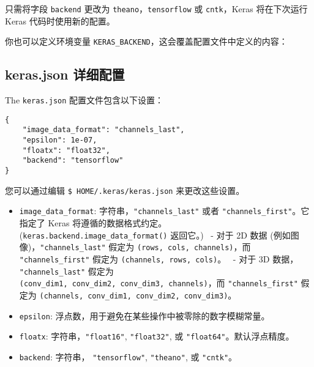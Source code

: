 只需将字段 \texttt{backend} 更改为 \texttt{theano}，\texttt{tensorflow}
或 \texttt{cntk}，Keras 将在下次运行 Keras 代码时使用新的配置。

你也可以定义环境变量
\texttt{KERAS\_BACKEND}，这会覆盖配置文件中定义的内容：

\begin{Shaded}
\begin{Highlighting}[]
 
 
\end{Highlighting}
\end{Shaded}


\subsection{keras.json
详细配置}\label{keras.json-ux8be6ux7ec6ux914dux7f6e}

The \texttt{keras.json} 配置文件包含以下设置：

\begin{verbatim}
{
    "image_data_format": "channels_last",
    "epsilon": 1e-07,
    "floatx": "float32",
    "backend": "tensorflow"
}
\end{verbatim}

您可以通过编辑 \texttt{\$\ HOME/.keras/keras.json} 来更改这些设置。

\begin{itemize}
\tightlist
\item
  \texttt{image\_data\_format}: 字符串，\texttt{"channels\_last"} 或者
  \texttt{"channels\_first"}。它指定了 Keras
  将遵循的数据格式约定。(\texttt{keras.backend.image\_data\_format()}
  返回它。) ~- 对于 2D 数据 (例如图像)，\texttt{"channels\_last"} 假定为
  \texttt{(rows,\ cols,\ channels)}，而 \texttt{"channels\_first"}
  假定为 \texttt{(channels,\ rows,\ cols)}。 ~- 对于 3D 数据，
  \texttt{"channels\_last"} 假定为
  \texttt{(conv\_dim1,\ conv\_dim2,\ conv\_dim3,\ channels)}，而
  \texttt{"channels\_first"} 假定为
  \texttt{(channels,\ conv\_dim1,\ conv\_dim2,\ conv\_dim3)}。
\item
  \texttt{epsilon}: 浮点数，用于避免在某些操作中被零除的数字模糊常量。
\item
  \texttt{floatx}: 字符串，\texttt{"float16"}, \texttt{"float32"}, 或
  \texttt{"float64"}。默认浮点精度。
\item
  \texttt{backend}: 字符串， \texttt{"tensorflow"}, \texttt{"theano"},
  或 \texttt{"cntk"}。
\end{itemize}


